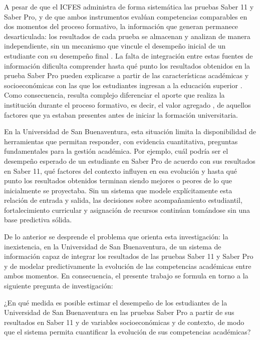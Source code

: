 A pesar de que el ICFES administra de forma sistemática las pruebas Saber 11 y Saber Pro, y de que ambos instrumentos evalúan competencias comparables en dos momentos del proceso formativo, la información que generan permanece desarticulada: los resultados de cada prueba se almacenan y analizan de manera independiente, sin un mecanismo que vincule el desempeño inicial de un estudiante con su desempeño final \cite{bogoya2013modelo}. La falta de integración entre estas fuentes de información dificulta comprender hasta qué punto los resultados obtenidos en la prueba Saber Pro pueden explicarse a partir de las características académicas y socioeconómicas con las que los estudiantes ingresan a la educación superior \cite{bogoya2017value}. Como consecuencia, resulta complejo diferenciar el aporte que realiza la institución durante el proceso formativo, es decir, el valor agregado \cite{mendoza2026valor}, de aquellos factores que ya estaban presentes antes de iniciar la formación universitaria. 

En la Universidad de San Buenaventura, esta situación limita la disponibilidad de herramientas que permitan responder, con evidencia cuantitativa, preguntas fundamentales para la gestión académica. Por ejemplo, cuál podría ser el desempeño esperado de un estudiante en Saber Pro de acuerdo con sus resultados en Saber 11, qué factores del contexto influyen en esa evolución \cite{rodriguez2022valor} y hasta qué punto los resultados obtenidos terminan siendo mejores o peores de lo que inicialmente se proyectaba. Sin un sistema que modele explícitamente esta relación de entrada y salida, las decisiones sobre acompañamiento estudiantil, fortalecimiento curricular y asignación de recursos continúan tomándose sin una base predictiva sólida.

De lo anterior se desprende el problema que orienta esta investigación: la inexistencia, en la Universidad de San Buenaventura, de un sistema de información capaz de integrar los resultados de las pruebas Saber 11 y Saber Pro y de modelar predictivamente la evolución de las competencias académicas entre ambos momentos. En consecuencia, el presente trabajo se formula en torno a la siguiente pregunta de investigación:

¿En qué medida es posible estimar el desempeño de los estudiantes de la Universidad de San Buenaventura en las pruebas Saber Pro a partir de sus resultados en Saber 11 y de variables socioeconómicas y de contexto, de modo que el sistema permita cuantificar la evolución de sus competencias académicas?